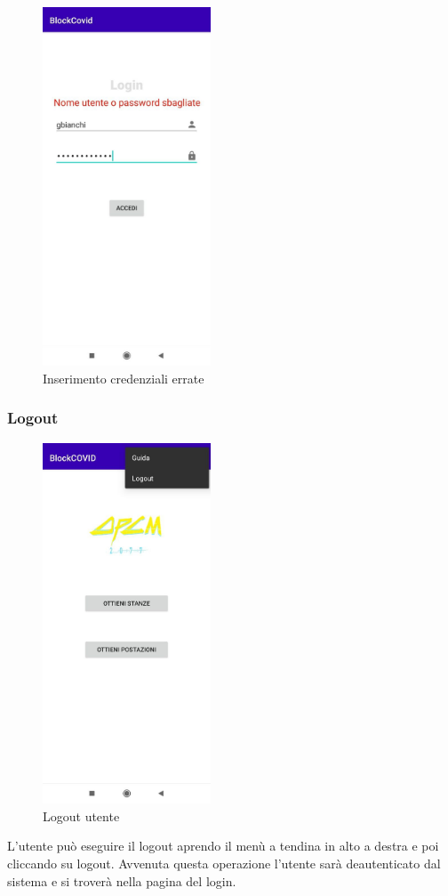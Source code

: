 	\begin{figure}[H]
		\centering
		\includegraphics[width=5cm]{res/images/credenzialiErrateAddetto.png}
		\caption{Inserimento credenziali errate}
	\end{figure}
	
	\subsubsection{Logout}
	\begin{figure}[H]
		\centering
		\includegraphics[width=5cm]{res/images/menuATendinaAddetto.png}
		\caption{Logout utente}
	\end{figure}
	L'utente può eseguire il logout aprendo il menù a tendina in alto a destra e poi cliccando su logout. Avvenuta questa operazione l'utente sarà deautenticato dal sistema e si troverà nella pagina del login.
	
